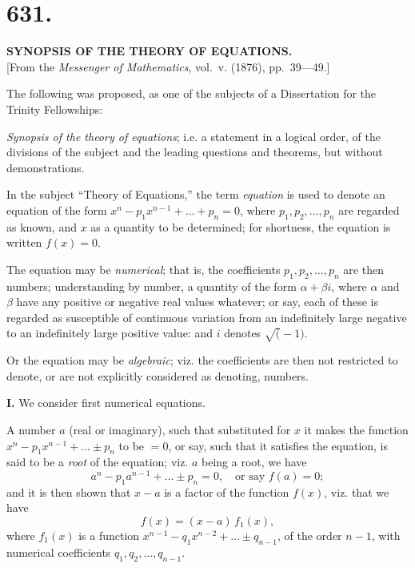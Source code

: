 \documentclass[12pt,a4paper]{article}
\begin{document}
\section*{631.}

\begin{center}
\textbf{SYNOPSIS OF THE THEORY OF EQUATIONS.}\\[1em]
[From the \textit{Messenger of Mathematics}, vol.~v. (1876), pp.~39---49.]
\end{center}

The following was proposed, as one of the subjects of a Dissertation for the Trinity Fellowships:

\textit{Synopsis of the theory of equations}; i.e. a statement in a logical order, of the divisions of the subject and the leading questions and theorems, but without demonstrations.

In the subject ``Theory of Equations,'' the term \textit{equation} is used to denote an equation of the form $x^n - p_1 x^{n-1} + \ldots + p_n = 0$, where $p_1, p_2, \ldots, p_n$ are regarded as known, and $x$ as a quantity to be determined; for shortness, the equation is written $f(x) = 0$.

The equation may be \textit{numerical}; that is, the coefficients $p_1, p_2, \ldots, p_n$ are then numbers; understanding by number, a quantity of the form $\alpha + \beta i$, where $\alpha$ and $\beta$ have any positive or negative real values whatever; or say, each of these is regarded as susceptible of continuous variation from an indefinitely large negative to an indefinitely large positive value: and $i$ denotes $\surd(-1)$.

Or the equation may be \textit{algebraic}; viz. the coefficients are then not restricted to denote, or are not explicitly considered as denoting, numbers.

\medskip\noindent\textbf{I.} We consider first numerical equations.

A number $a$ (real or imaginary), such that substituted for $x$ it makes the function $x^n - p_1 x^{n-1} + \ldots \pm p_n$ to be $=0$, or say, such that it satisfies the equation, is said to be a \textit{root} of the equation; viz. $a$ being a root, we have
\[
a^n - p_1 a^{n-1} + \ldots \pm p_n = 0, \quad \text{or say } f(a) = 0;
\]
and it is then shown that $x - a$ is a factor of the function $f(x)$, viz. that we have
\[
f(x) = (x-a)\, f_1(x),
\]
where $f_1(x)$ is a function $x^{n-1} - q_1 x^{n-2} + \ldots \pm q_{n-1}$, of the order $n-1$, with numerical coefficients $q_1, q_2, \ldots, q_{n-1}$.
\end{document}
